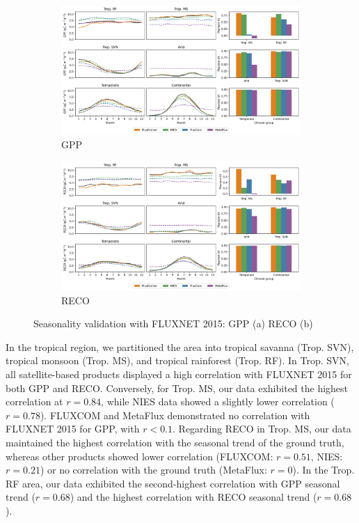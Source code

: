 \begin{figure}[p]
    \centering
    \begin{subfigure}{\textwidth}
      \centering
      \includegraphics[width=.8\textwidth]{figs/chap6/seasonal_fluxnet_GPP.jpg}
      \caption{GPP}
      \label{fig:chap6_fig4a}
    \end{subfigure}

    \begin{subfigure}{\textwidth}
      \centering
      \includegraphics[width=.8\textwidth]{figs/chap6/seasonal_fluxnet_RECO.jpg}
      \caption{RECO}
      \label{fig:chap6_fig4b}
    \end{subfigure}
    \caption[Seasonality validation with FLUXNET 2015]{Seasonality validation with FLUXNET 2015: GPP (a) RECO (b)}
    \label{fig:chap6_fig4}
\end{figure}
In the tropical region, we partitioned the area into tropical savanna (Trop. SVN), tropical monsoon (Trop. MS), and tropical rainforest (Trop. RF). In Trop. SVN, all satellite-based products displayed a high correlation with FLUXNET 2015 for both GPP and RECO. Conversely, for Trop. MS, our data exhibited the highest correlation at $r=0.84$, while NIES data showed a slightly lower correlation ($r=0.78$). FLUXCOM and MetaFlux demonstrated no correlation with FLUXNET 2015 for GPP, with $r<0.1$. Regarding RECO in Trop. MS, our data maintained the highest correlation with the seasonal trend of the ground truth, whereas other products showed lower correlation (FLUXCOM: $r=0.51$, NIES: $r=0.21$) or no correlation with the ground truth (MetaFlux: $r=0$). In the Trop. RF area, our data exhibited the second-highest correlation with GPP seasonal trend ($r=0.68$) and the highest correlation with RECO seasonal trend ($r=0.68$).\par
